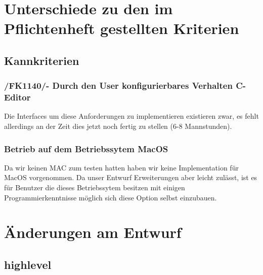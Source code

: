 \documentclass[a4paper]{scrreprt}
\begin{document}
\chapter{Unterschiede zu den im Pflichtenheft gestellten Kriterien}

\section{Kannkriterien}

\subsection{/FK1140/- Durch den User konfigurierbares Verhalten C-Editor}
Die Interfaces um diese Anforderungen zu implementieren existieren zwar, es fehlt allerdings an der Zeit dies jetzt noch fertig zu stellen (6-8 Mannstunden).

\subsection{Betrieb auf dem Betriebssytem MacOS} 
Da wir keinen MAC zum testen hatten haben wir keine Implementation für MacOS
vorgenommen. Da unser Entwurf Erweiterungen aber leicht zulässt, ist es für
Benutzer die dieses Betriebssytem besitzen mit einigen Programmierkenntnisse
möglich sich diese Option selbst einzubauen.

\chapter{Änderungen am Entwurf}
\section{highlevel}
\end{document}
